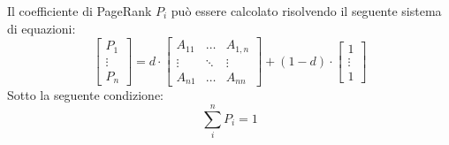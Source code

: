 Il coefficiente di PageRank $P_i$ può essere calcolato risolvendo il seguente
sistema di equazioni:
\begin{equation}
    \left[
        \begin{array}{c}
            P_1    \\
            \vdots \\
            P_n
        \end{array}
        \right] = d \cdot \left[
        \begin{array}{ccc}
            A_{11} & \dots  & A_{1, n} \\
            \vdots & \ddots & \vdots   \\
            A_{n1} & \dots  & A_{nn}
        \end{array}
        \right] + (1 - d) \cdot \left[
        \begin{array}{c}
            1      \\
            \vdots \\
            1
        \end{array} \right]
\end{equation}
Sotto la seguente condizione:
\begin{equation*}
    \sum_{i}^n P_i = 1
\end{equation*}
